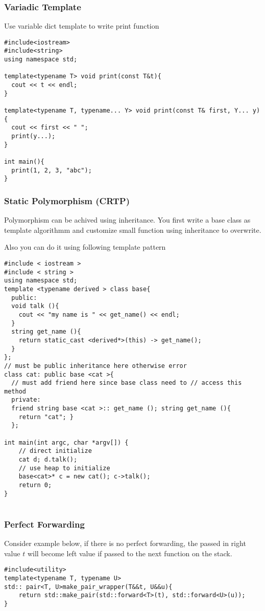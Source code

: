 \subsubsection{Variadic Template}

Use variable dict template to write print function

\begin{lstlisting}
#include<iostream>
#include<string>
using namespace std;

template<typename T> void print(const T&t){
  cout << t << endl;
}

template<typename T, typename... Y> void print(const T& first, Y... y){
  cout << first << " ";
  print(y...);
}

int main(){
  print(1, 2, 3, "abc");
}
\end{lstlisting}

\subsubsection{Static Polymorphism (CRTP)}
Polymorphism can be achived using inheritance. You first write a base class as template algorithmm and customize small function using inheritance to overwrite.

Also you can do it using following template pattern
\begin{lstlisting}
#include < iostream >
#include < string >
using namespace std;
template <typename derived > class base{
  public:
  void talk (){
    cout << "my name is " << get_name() << endl;
  }
  string get_name (){
    return static_cast <derived*>(this) -> get_name();
  }
};
// must be public inheritance here otherwise error
class cat: public base <cat >{
  // must add friend here since base class need to // access this method
  private:
  friend string base <cat >:: get_name (); string get_name (){
    return "cat"; }
  };

int main(int argc, char *argv[]) {
    // direct initialize
    cat d; d.talk();
    // use heap to initialize
    base<cat>* c = new cat(); c->talk();
    return 0;
}


\end{lstlisting}

\subsubsection{Perfect Forwarding}

Consider example below, if there is no perfect forwarding, the passed in right value $t$ will become left value if passed to the next function on the stack.
\begin{lstlisting}
#include<utility>
template<typename T, typename U>
std:: pair<T, U>make_pair_wrapper(T&&t, U&&u){
	return std::make_pair(std::forward<T>(t), std::forward<U>(u));
}
\end{lstlisting}
